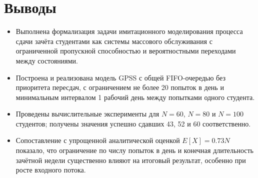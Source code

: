 \documentclass[a4paper, 14pt]{extarticle}
\begin{document}
\section{Выводы}
\begin{itemize}
  \item Выполнена формализация задачи имитационного моделирования процесса сдачи зачёта студентами как системы массового обслуживания с ограниченной пропускной способностью и вероятностными переходами между состояниями.
  
  \item Построена и реализована модель GPSS с общей FIFO-очередью без приоритета пересдач, с ограничением не более 20 попыток в день и минимальным интервалом 1 рабочий день между попытками одного студента.
  
  \item Проведены вычислительные эксперименты для $N=60$, $N=80$ и $N=100$ студентов; получены значения успешно сдавших 43, 52 и 60 соответственно.
  
  \item Сопоставление с упрощенной аналитической оценкой $E[X]=0.73N$ показало, что ограничение по числу попыток в день и конечная длительность зачётной недели существенно влияют на итоговый результат, особенно при росте входного потока.
  
\end{itemize}
\end{document}
